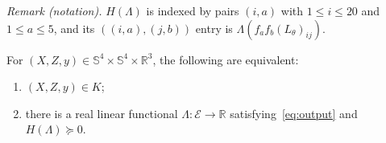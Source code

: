 \noindent\textit{Remark (notation).} $H(\Lambda)$ is indexed by pairs $(i,a)$ with $1\leq i\leq20$ and $1\leq a\leq5$, and its $((i,a),(j,b))$ entry is $\Lambda(f_af_b(L_\theta)_{ij})$.


                
\begin{proposition}\label{prop:lift}
For $(X,Z,y)\in\mathbb S^4\times\mathbb S^4\times\mathbb R^3$, the
following are equivalent:
\begin{enumerate}
  \item $(X,Z,y)\in K$;
  \item there is a real linear functional $\Lambda:\mathcal E\to\mathbb R$
  satisfying~\eqref{eq:output} and $H(\Lambda)\succeq0$.
\end{enumerate}
\end{proposition}
              


